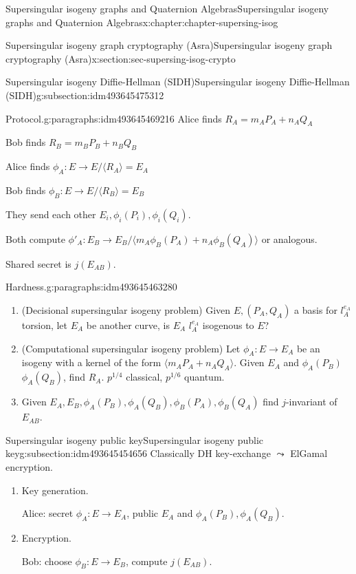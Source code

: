 \documentclass[oneside,10pt,]{book}
\numberwithin{equation}{section}
\begin{document}
\begin{chapterptx}{Supersingular isogeny graphs and Quaternion Algebras}{}{Supersingular isogeny graphs and Quaternion Algebras}{}{}{x:chapter:chapter-supersing-isog}
\begin{sectionptx}{Supersingular isogeny graph cryptography (Asra)}{}{Supersingular isogeny graph cryptography (Asra)}{}{}{x:section:sec-supersing-isog-crypto}
\begin{subsectionptx}{Supersingular isogeny Diffie-Hellman (SIDH)}{}{Supersingular isogeny Diffie-Hellman (SIDH)}{}{}{g:subsection:idm493645475312}
\begin{paragraphs}{Protocol.}{g:paragraphs:idm493645469216}
Alice finds \(R_A = m_AP_A + n_AQ_A\)%
\par
Bob finds \(R_B = m_BP_B + n_BQ_B\)%
\par
Alice finds \(\phi_A \colon E \to E/\langle R_A\rangle = E_A\)%
\par
Bob finds \(\phi_B \colon E \to E/\langle R_B\rangle = E_B\)%
\par
They send each other \(E_i, \phi_i(P_i),\phi_i(Q_i)\).%
\par
Both compute \(\phi'_A\colon E_B \to E_B/\langle m_A\phi_B(P_A) + n_A\phi_B(Q_A)\rangle\) or analogous.%
\par
Shared secret is \(j(E_{AB})\).%
\end{paragraphs}%
\begin{paragraphs}{Hardness.}{g:paragraphs:idm493645463280}%
%
\begin{enumerate}
\item{}(Decisional supersingular isogeny problem) Given \(E, (P_A,Q_A)\) a basis for \(l_A^{e_A}\) torsion, let \(E_A\) be another curve, is \(E_A\) \(l_A^{e_A}\) isogenous to \(E\)?%
\item{}(Computational supersingular isogeny problem) Let \(\phi_A \colon E \to E_A\) be an isogeny with a kernel of the form \(\langle m_AP_A + n_AQ_A \rangle\). Given \(E_A\) and \(\phi_A(P_B)\) \(\phi_A(Q_B)\), find \(R_A\). \(p^{1/4}\) classical, \(p^{1/6}\) quantum.%
\item{}Given \(E_A, E_B, \phi_A(P_B), \phi_A(Q_B), \phi_B(P_A), \phi_B(Q_A)\) find \(j\)-invariant of \(E_{AB}\).%
\end{enumerate}
%
\end{paragraphs}%
\end{subsectionptx}
%
%
\typeout{************************************************}
\typeout{************************************************}
%
\begin{subsectionptx}{Supersingular isogeny public key}{}{Supersingular isogeny public key}{}{}{g:subsection:idm493645454656}
Classically DH key-exchange \(\leadsto\) ElGamal encryption.%
\par
%
\begin{enumerate}
\item{}Key generation.%
\par
Alice: secret \(\phi_A \colon E \to E_A\), public \(E_A\) and \(\phi_A(P_B), \phi_A(Q_B)\).%
\item{}Encryption.%
\par
Bob: choose \(\phi_B \colon E \to E_B\), compute \(j(E_{AB})\).%

\end{enumerate}
\end{subsectionptx}
\end{sectionptx}
\end{chapterptx}
\end{document}
